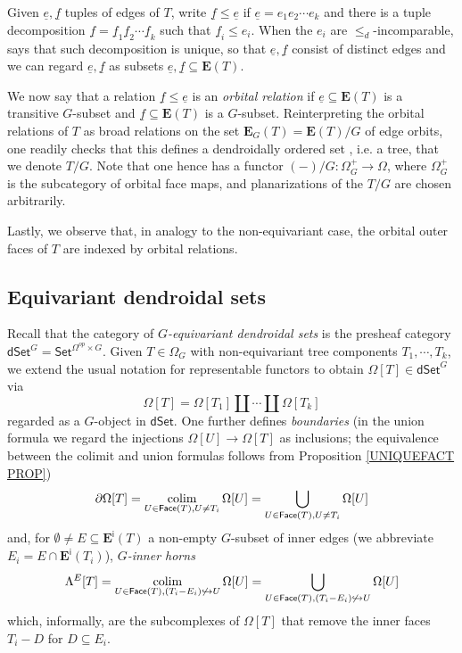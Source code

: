 \documentclass[a4paper,10pt
,draft
]{article}%
\begin{document}
\begin{remark}
Given $\underline{e},\underline{f}$ tuples of edges of $T$, 
write $\underline{f} \leq \underline{e}$
if $\underline{e} = e_1 e_2 \cdots e_k$
and there is a tuple decomposition
$\underline{f} = 
\underline{f}_1 \underline{f}_2 \cdots
\underline{f}_k$
such that $\underline{f}_i \leq e_i$.
When the $e_i$ are $\leq_d$-incomparable,
\cite[Prop. 5.30]{Per18} says that such decomposition is unique, so that $\underline{e},\underline{f}$ consist of distinct edges and we can regard 
$\underline{e},\underline{f}$ as subsets $\underline{e},\underline{f} \subseteq \boldsymbol{E}(T)$.
	
We now say that a relation
$\underline{f} \leq \underline{e}$	
is an \textit{orbital relation} if
$\underline{e} \subseteq \boldsymbol{E}(T)$
is a transitive $G$-subset and $\underline{f} \subseteq \boldsymbol{E}(T)$ is a $G$-subset. 
Reinterpreting the orbital relations of $T$ 
as broad relations on the set 
$\boldsymbol{E}_{G}(T) = \boldsymbol{E}(T)/G$ of edge orbits,
one readily checks that this defines a 
dendroidally ordered set \cite[Def. 5.9]{Per18},
i.e. a tree, that we denote $T/G$.
Note that one hence has a functor
$(-)/G \colon \Omega_G^+ \to \Omega$,
where $\Omega_G^+$ is the subcategory of orbital face maps,
and planarizations of the $T/G$ are chosen arbitrarily.

Lastly, we observe that, in analogy to the non-equivariant case,
the orbital outer faces of $T$ are indexed by orbital relations.
\end{remark}



\subsection{Equivariant dendroidal sets}\label{EQDENDSETS SEC}

Recall \cite[\S 5.4]{Per18} that the category of 
\textit{$G$-equivariant dendroidal sets}
is the presheaf category 
$\mathsf{dSet}^G = \mathsf{Set}^{\Omega^{op} \times G}$.
Given $T \in \Omega_G$ with non-equivariant tree components $T_1,\cdots,T_k$,
we extend the usual notation for representable functors 
to obtain $\Omega[T] \in \mathsf{dSet}^G$ via
\[
	\Omega[T] = \Omega[T_1] \amalg \cdots \amalg \Omega[T_k]
\]
regarded as a $G$-object in $\mathsf{dSet}$.
One further defines \textit{boundaries} (in the union formula we regard the injections $\Omega[U] \to \Omega[T]$ as inclusions; the equivalence between the colimit and union formulas follows from Proposition \ref{UNIQUEFACT PROP})
\[
	\partial \Omega[T] = 
	\mathop{\operatorname{colim}}_{U \in \mathsf{Face}(T),U \neq T_i}
	\Omega[U] =
	\bigcup_{U \in \mathsf{Face}(T),U \neq T_i}
	\Omega[U]
\]
and, for $\emptyset \neq E \subseteq \boldsymbol{E}^{\mathsf{i}}(T)$ a
non-empty $G$-subset of inner edges 
(we abbreviate $E_i = E \cap \boldsymbol{E}^{\mathsf{i}}(T_i)$), \textit{$G$-inner horns}
\[
	\Lambda^{E}[T] = 
	\mathop{\operatorname{colim}}_{U \in 
	\mathsf{Face}(T),
	(T_i - E_i) \not \hookrightarrow U}
	\Omega[U] =
	\bigcup_{U \in 
	\mathsf{Face}(T),
	(T_i - E_i) \not \hookrightarrow U}
	\Omega[U]
\]
which, informally, are the subcomplexes of $\Omega[T]$ that remove the inner faces $T_i-D$ for $D \subseteq E_i$.
\end{document}
